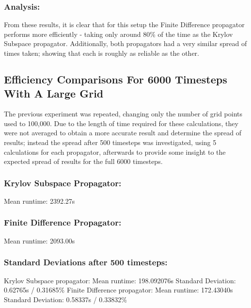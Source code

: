 \subsubsection{Analysis:}
From these results, it is clear that for this setup the Finite Difference propagator performs more efficiently - taking only around 80\% of the time as the Krylov Subspace propagator. Additionally, both propagators had a very similar spread of times taken; showing that each is roughly as reliable as the other.

\subsection{Efficiency Comparisons For 6000 Timesteps With A Large Grid}
The previous experiment was repeated, changing only the number of grid points used to 100,000. Due to the length of time required for these calculations, they were not averaged to obtain a more accurate result and determine the spread of results; instead the spread after 500 timesteps was investigated, using 5 calculations for each propagator, afterwards to provide some insight to the expected spread of results for the full 6000 timesteps.

\subsubsection{Krylov Subspace Propagator:}
Mean runtime: \hspace{2cm} 2392.27s

\subsubsection{Finite Difference Propagator:}
Mean runtime: 2093.00s

\subsubsection{Standard Deviations after 500 timesteps:}
Krylov Subspace propagator:\newline
Mean runtime: \hspace{2cm} 198.092076s\newline
Standard Deviation: 0.62765s / 0.31685\%\newline\newline
Finite Difference propagator:\newline
Mean runtime: \hspace{2cm} 172.43040s\newline
Standard Deviation: 0.58337s / 0.33832\%

